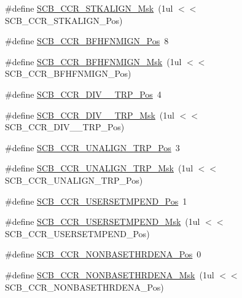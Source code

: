 \begin{DoxyCompactItemize}
\item 
\#define \hyperlink{group___c_m_s_i_s___c_m3___s_c_b_ga33cf22d3d46af158a03aad25ddea1bcb}{S\-C\-B\-\_\-\-C\-C\-R\-\_\-\-S\-T\-K\-A\-L\-I\-G\-N\-\_\-\-Msk}~(1ul $<$$<$ S\-C\-B\-\_\-\-C\-C\-R\-\_\-\-S\-T\-K\-A\-L\-I\-G\-N\-\_\-\-Pos)
\item 
\#define \hyperlink{group___c_m_s_i_s___c_m3___s_c_b_ga4010a4f9e2a745af1b58abe1f791ebbf}{S\-C\-B\-\_\-\-C\-C\-R\-\_\-\-B\-F\-H\-F\-N\-M\-I\-G\-N\-\_\-\-Pos}~8
\item 
\#define \hyperlink{group___c_m_s_i_s___c_m3___s_c_b_ga89a28cc31cfc7d52d9d7a8fcc69c7eac}{S\-C\-B\-\_\-\-C\-C\-R\-\_\-\-B\-F\-H\-F\-N\-M\-I\-G\-N\-\_\-\-Msk}~(1ul $<$$<$ S\-C\-B\-\_\-\-C\-C\-R\-\_\-\-B\-F\-H\-F\-N\-M\-I\-G\-N\-\_\-\-Pos)
\item 
\#define \hyperlink{group___c_m_s_i_s___c_m3___s_c_b_gac8d512998bb8cd9333fb7627ddf59bba}{S\-C\-B\-\_\-\-C\-C\-R\-\_\-\-D\-I\-V\-\_\-\_\-\-T\-R\-P\-\_\-\-Pos}~4
\item 
\#define \hyperlink{group___c_m_s_i_s___c_m3___s_c_b_gabb9aeac71b3abd8586d0297070f61dcb}{S\-C\-B\-\_\-\-C\-C\-R\-\_\-\-D\-I\-V\-\_\-\_\-\-T\-R\-P\-\_\-\-Msk}~(1ul $<$$<$ S\-C\-B\-\_\-\-C\-C\-R\-\_\-\-D\-I\-V\-\_\-\_\-\-T\-R\-P\-\_\-\-Pos)
\item 
\#define \hyperlink{group___c_m_s_i_s___c_m3___s_c_b_gac4e4928b864ea10fc24dbbc57d976229}{S\-C\-B\-\_\-\-C\-C\-R\-\_\-\-U\-N\-A\-L\-I\-G\-N\-\_\-\-T\-R\-P\-\_\-\-Pos}~3
\item 
\#define \hyperlink{group___c_m_s_i_s___c_m3___s_c_b_ga68c96ad594af70c007923979085c99e0}{S\-C\-B\-\_\-\-C\-C\-R\-\_\-\-U\-N\-A\-L\-I\-G\-N\-\_\-\-T\-R\-P\-\_\-\-Msk}~(1ul $<$$<$ S\-C\-B\-\_\-\-C\-C\-R\-\_\-\-U\-N\-A\-L\-I\-G\-N\-\_\-\-T\-R\-P\-\_\-\-Pos)
\item 
\#define \hyperlink{group___c_m_s_i_s___c_m3___s_c_b_ga789e41f45f59a8cd455fd59fa7652e5e}{S\-C\-B\-\_\-\-C\-C\-R\-\_\-\-U\-S\-E\-R\-S\-E\-T\-M\-P\-E\-N\-D\-\_\-\-Pos}~1
\item 
\#define \hyperlink{group___c_m_s_i_s___c_m3___s_c_b_ga4cf59b6343ca962c80e1885710da90aa}{S\-C\-B\-\_\-\-C\-C\-R\-\_\-\-U\-S\-E\-R\-S\-E\-T\-M\-P\-E\-N\-D\-\_\-\-Msk}~(1ul $<$$<$ S\-C\-B\-\_\-\-C\-C\-R\-\_\-\-U\-S\-E\-R\-S\-E\-T\-M\-P\-E\-N\-D\-\_\-\-Pos)
\item 
\#define \hyperlink{group___c_m_s_i_s___c_m3___s_c_b_gab4615f7deb07386350365b10240a3c83}{S\-C\-B\-\_\-\-C\-C\-R\-\_\-\-N\-O\-N\-B\-A\-S\-E\-T\-H\-R\-D\-E\-N\-A\-\_\-\-Pos}~0
\item 
\#define \hyperlink{group___c_m_s_i_s___c_m3___s_c_b_gafe0f6be81b35d72d0736a0a1e3b4fbb3}{S\-C\-B\-\_\-\-C\-C\-R\-\_\-\-N\-O\-N\-B\-A\-S\-E\-T\-H\-R\-D\-E\-N\-A\-\_\-\-Msk}~(1ul $<$$<$ S\-C\-B\-\_\-\-C\-C\-R\-\_\-\-N\-O\-N\-B\-A\-S\-E\-T\-H\-R\-D\-E\-N\-A\-\_\-\-Pos)

\end{DoxyCompactItemize}
